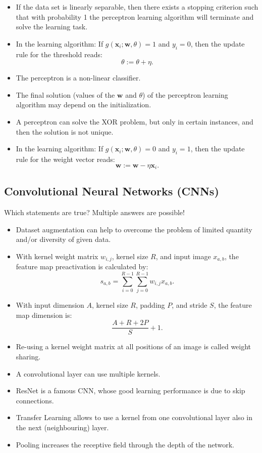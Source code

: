 \documentclass{article}
\begin{document}
\begin{itemize}
    \item[(a)] If the data set is linearly separable, then there exists a stopping criterion such that with probability 1 the perceptron learning algorithm will terminate and solve the learning task.
    \item[(b)] In the learning algorithm: If \(g(\mathbf{x}_i; \mathbf{w}, \theta) = 1\) and \(y_i = 0\), then the update rule for the threshold reads: 
    \[
    \theta := \theta + \eta.
    \]
    \item[(c)] The perceptron is a non-linear classifier.
    \item[(d)] The final solution (values of the \(\mathbf{w}\) and \(\theta\)) of the perceptron learning algorithm may depend on the initialization.
    \item[(e)] A perceptron can solve the XOR problem, but only in certain instances, and then the solution is not unique.
    \item[(f)] In the learning algorithm: If \(g(\mathbf{x}_i; \mathbf{w}, \theta) = 0\) and \(y_i = 1\), then the update rule for the weight vector reads:
    \[
    \mathbf{w} := \mathbf{w} - \eta \mathbf{x}_i.
    \]
\end{itemize}

\subsection*{Convolutional Neural Networks (CNNs)}

Which statements are true? Multiple answers are possible!

\begin{itemize}
    \item[(a)] Dataset augmentation can help to overcome the problem of limited quantity and/or diversity of given data.
    \item[(b)] With kernel weight matrix \(w_{i,j}\), kernel size \(R\), and input image \(x_{a,b}\), the feature map preactivation is calculated by:
    \[
    s_{a,b} = \sum_{i=0}^{R-1} \sum_{j=0}^{R-1} w_{i,j} x_{a,b}.
    \]
    \item[(c)] With input dimension \(A\), kernel size \(R\), padding \(P\), and stride \(S\), the feature map dimension is:
    \[
    \frac{A + R + 2P}{S} + 1.
    \]
    \item[(d)] Re-using a kernel weight matrix at all positions of an image is called weight sharing.
    \item[(e)] A convolutional layer can use multiple kernels.
    \item[(f)] ResNet is a famous CNN, whose good learning performance is due to skip connections.
    \item[(g)] Transfer Learning allows to use a kernel from one convolutional layer also in the next (neighbouring) layer.
    \item[(h)] Pooling increases the receptive field through the depth of the network.
\end{itemize}
\end{document}
